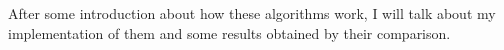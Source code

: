 After some introduction about how these algorithms work, I will talk about my implementation of them and some results obtained by their comparison.






